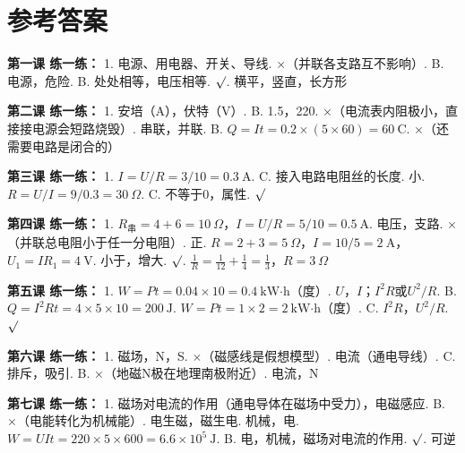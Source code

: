 \documentclass[a4paper,12pt]{ctexart}
\begin{document}
\newpage
\section*{\textcolor{defblue}{参考答案}}

\textbf{第一课 练一练：}
1. 电源、用电器、开关、导线. ×（并联各支路互不影响）. B. 电源，危险. B. 处处相等，电压相等. $\surd$. 横平，竖直，长方形

\textbf{第二课 练一练：}
1. 安培（A），伏特（V）. B. 1.5，220. ×（电流表内阻极小，直接接电源会短路烧毁）. 串联，并联. B. $Q=It=0.2\times(5\times60)=60\ \text{C}$. ×（还需要电路是闭合的）

\textbf{第三课 练一练：}
1. $I=U/R=3/10=0.3\ \text{A}$. C. 接入电路电阻丝的长度. 小. $R=U/I=9/0.3=30\ \Omega$. C. 不等于0，属性. $\surd$

\textbf{第四课 练一练：}
1. $R_{\text{串}}=4+6=10\ \Omega$，$I=U/R=5/10=0.5\ \text{A}$. 电压，支路. ×（并联总电阻小于任一分电阻）. 正. $R=2+3=5\ \Omega$，$I=10/5=2\ \text{A}$，$U_1=IR_1=4\ \text{V}$. 小于，增大. $\surd$. $\frac{1}{R}=\frac{1}{12}+\frac{1}{4}=\frac{1}{3}$，$R=3\ \Omega$

\textbf{第五课 练一练：}
1. $W=Pt=0.04\times10=0.4\ \text{kW·h}$（度）. $U$，$I$；$I^2R$或$U^2/R$. B. $Q=I^2Rt=4\times5\times10=200\ \text{J}$. $W=Pt=1\times2=2\ \text{kW·h}$（度）. C. $I^2R$，$U^2/R$. $\surd$

\textbf{第六课 练一练：}
1. 磁场，N，S. ×（磁感线是假想模型）. 电流（通电导线）. C. 排斥，吸引. B. ×（地磁N极在地理南极附近）. 电流，N

\textbf{第七课 练一练：}
1. 磁场对电流的作用（通电导体在磁场中受力），电磁感应. B. ×（电能转化为机械能）. 电生磁，磁生电. 机械，电. $W=UIt=220\times5\times600=6.6\times10^5\ \text{J}$. B. 电，机械，磁场对电流的作用. $\surd$. 可逆
\end{document}
